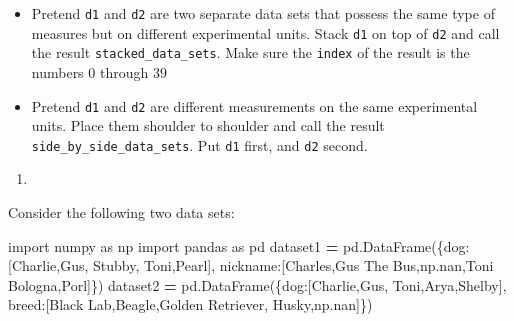 \documentclass[
  12pt,
  krantz2]{krantz}
\makeatletter
\newenvironment{Shaded}{\begin{snugshade}}{\end{snugshade}}
\newcommand{\ImportTok}[1]{#1}
\newcommand{\NormalTok}[1]{#1}
\newcommand{\OperatorTok}[1]{\textcolor[rgb]{0.43,0.43,0.43}{\textbf{#1}}}
\newcommand{\StringTok}[1]{\textcolor[rgb]{0.5,0.5,0.5}{#1}}
\providecommand{\tightlist}{%
  \setlength{\itemsep}{0pt}\setlength{\parskip}{0pt}}
\newenvironment{kframe}{%
\medskip{}
\setlength{\fboxsep}{.8em}
 \def\at@end@of@kframe{}%
 \ifinner\ifhmode%
  \def\at@end@of@kframe{\end{minipage}}%
  \begin{minipage}{\columnwidth}%
 \fi\fi%
 \def\FrameCommand##1{\hskip\@totalleftmargin \hskip-\fboxsep
 \colorbox{shadecolor}{##1}\hskip-\fboxsep
     \hskip-\linewidth \hskip-\@totalleftmargin \hskip\columnwidth}%
 \MakeFramed {\advance\hsize-\width
   \@totalleftmargin\z@ \linewidth\hsize
   \@setminipage}}%
 {\par\unskip\endMakeFramed%
 \at@end@of@kframe}
\renewenvironment{Shaded}{\begin{kframe}}{\end{kframe}}
\makeatother
\begin{document}
\begin{itemize}
\tightlist
\item
  Pretend \texttt{d1} and \texttt{d2} are two separate data sets that possess the same type of measures but on different experimental units. Stack \texttt{d1} on top of \texttt{d2} and call the result \texttt{stacked\_data\_sets}. Make sure the \texttt{index} of the result is the numbers \(0\) through \(39\)
\item
  Pretend \texttt{d1} and \texttt{d2} are different measurements on the same experimental units. Place them shoulder to shoulder and call the result \texttt{side\_by\_side\_data\_sets}. Put \texttt{d1} first, and \texttt{d2} second.
\end{itemize}

\begin{enumerate}
\def\labelenumi{\arabic{enumi}.}
\setcounter{enumi}{2}
\tightlist
\item
\end{enumerate}

Consider the following two data sets:

\begin{Shaded}
\begin{Highlighting}[]
\ImportTok{import}\NormalTok{ numpy }\ImportTok{as}\NormalTok{ np}
\ImportTok{import}\NormalTok{ pandas }\ImportTok{as}\NormalTok{ pd}
\NormalTok{dataset1 }\OperatorTok{=}\NormalTok{ pd.DataFrame(\{}\StringTok{\textquotesingle{}dog\textquotesingle{}}\NormalTok{:[}\StringTok{\textquotesingle{}Charlie\textquotesingle{}}\NormalTok{,}\StringTok{\textquotesingle{}Gus\textquotesingle{}}\NormalTok{, }\StringTok{\textquotesingle{}Stubby\textquotesingle{}}\NormalTok{, }\StringTok{\textquotesingle{}Toni\textquotesingle{}}\NormalTok{,}\StringTok{\textquotesingle{}Pearl\textquotesingle{}}\NormalTok{],}
                        \StringTok{\textquotesingle{}nickname\textquotesingle{}}\NormalTok{:[}\StringTok{\textquotesingle{}Charles\textquotesingle{}}\NormalTok{,}\StringTok{\textquotesingle{}Gus The Bus\textquotesingle{}}\NormalTok{,np.nan,}\StringTok{\textquotesingle{}Toni Bologna\textquotesingle{}}\NormalTok{,}\StringTok{\textquotesingle{}Porl\textquotesingle{}}\NormalTok{]\})}
\NormalTok{dataset2 }\OperatorTok{=}\NormalTok{ pd.DataFrame(\{}\StringTok{\textquotesingle{}dog\textquotesingle{}}\NormalTok{:[}\StringTok{\textquotesingle{}Charlie\textquotesingle{}}\NormalTok{,}\StringTok{\textquotesingle{}Gus\textquotesingle{}}\NormalTok{, }\StringTok{\textquotesingle{}Toni\textquotesingle{}}\NormalTok{,}\StringTok{\textquotesingle{}Arya\textquotesingle{}}\NormalTok{,}\StringTok{\textquotesingle{}Shelby\textquotesingle{}}\NormalTok{],}
                        \StringTok{\textquotesingle{}breed\textquotesingle{}}\NormalTok{:[}\StringTok{\textquotesingle{}Black Lab\textquotesingle{}}\NormalTok{,}\StringTok{\textquotesingle{}Beagle\textquotesingle{}}\NormalTok{,}\StringTok{\textquotesingle{}Golden Retriever\textquotesingle{}}\NormalTok{, }\StringTok{\textquotesingle{}Husky\textquotesingle{}}\NormalTok{,np.nan]\})}
\end{Highlighting}
\end{Shaded}
\end{document}
